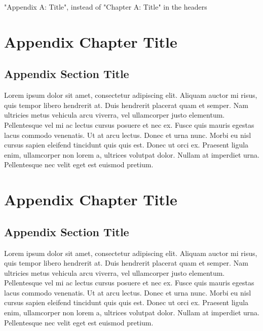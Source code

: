 \documentclass[
	11pt, %
	fleqn, %
	a4paper, %
]{LegrandOrangeBook}
\begin{document}
\begin{appendices}

\renewcommand{\chaptername}{Appendix} %
"Appendix A: Title", instead of "Chapter A: Title" in the headers




\chapter{Appendix Chapter Title}



\section{Appendix Section Title}

Lorem ipsum dolor sit amet, consectetur adipiscing elit.
Aliquam auctor mi risus, quis tempor libero hendrerit at.
Duis hendrerit placerat quam et semper.
Nam ultricies metus vehicula arcu viverra, vel ullamcorper justo elementum.
Pellentesque vel mi ac lectus cursus posuere et nec ex.
Fusce quis mauris egestas lacus commodo venenatis.
Ut at arcu lectus.
Donec et urna nunc.
Morbi eu nisl cursus sapien eleifend tincidunt quis quis est.
Donec ut orci ex.
Praesent ligula enim, ullamcorper non lorem a, ultrices volutpat dolor.
Nullam at imperdiet urna.
Pellentesque nec velit eget est euismod pretium.




\chapter{Appendix Chapter Title}



\section{Appendix Section Title}

Lorem ipsum dolor sit amet, consectetur adipiscing elit.
Aliquam auctor mi risus, quis tempor libero hendrerit at.
Duis hendrerit placerat quam et semper.
Nam ultricies metus vehicula arcu viverra, vel ullamcorper justo elementum.
Pellentesque vel mi ac lectus cursus posuere et nec ex.
Fusce quis mauris egestas lacus commodo venenatis.
Ut at arcu lectus.
Donec et urna nunc.
Morbi eu nisl cursus sapien eleifend tincidunt quis quis est.
Donec ut orci ex.
Praesent ligula enim, ullamcorper non lorem a, ultrices volutpat dolor.
Nullam at imperdiet urna.
Pellentesque nec velit eget est euismod pretium.


\end{appendices}

\end{document}
